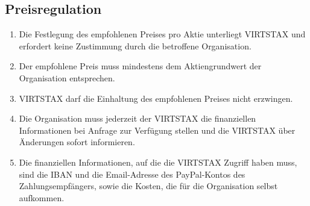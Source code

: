 \documentclass{article}
\begin{document}
\subsection{Preisregulation}
\begin{enumerate}[(1)]
    \item Die Festlegung des empfohlenen Preises pro Aktie unterliegt VIRTSTAX und erfordert keine Zustimmung durch die betroffene Organisation.
    \item Der empfohlene Preis muss mindestens dem Aktiengrundwert der Organisation entsprechen.
    \item VIRTSTAX darf die Einhaltung des empfohlenen Preises nicht erzwingen.
    \item Die Organisation muss jederzeit der VIRTSTAX die finanziellen Informationen bei Anfrage zur Verfügung stellen und die VIRTSTAX über Änderungen sofort informieren.
    \item Die finanziellen Informationen, auf die die VIRTSTAX Zugriff haben muss, sind die IBAN und die Email-Adresse des PayPal-Kontos des Zahlungsempfängers, sowie die Kosten, die für die Organisation selbst aufkommen.
\end{enumerate}
\end{document}
